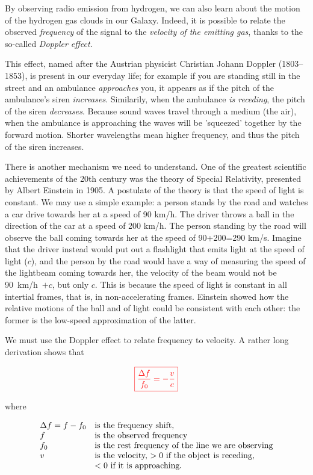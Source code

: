 By observing radio emission from hydrogen, we can also learn about the
motion of the hydrogen gas clouds in our Galaxy. 
Indeed, it is possible to relate the observed {\em frequency} of the
signal to the {\em velocity of the emitting gas}, thanks to the
so-called {\em Doppler effect}.

This effect, named after the Austrian physicist Christian Johann
Doppler (1803--1853), is present in our everyday life; for example if
you are standing still in the street and an ambulance {\em approaches} you,
it appears as if the pitch of the ambulance's siren
{\em increases}. Similarily, when the ambulance {\em is receding}, the pitch of
the siren {\em decreases}. Because sound waves travel through a medium (the
air), when the ambulance is approaching the waves will be 'squeezed'
together by the forward motion. Shorter wavelengths mean higher
frequency, and thus the pitch of the siren increases.

There is another mechanism we need to understand.  
One of the greatest scientific achievements of the 20th
century was the theory of Special Relativity, presented by Albert
Einstein in 1905. A postulate of the theory is
that the speed of light is constant. We may use a simple example: a
person stands by the road and watches a car drive towards her at
a speed of 90 km/h. The driver throws a ball in the direction of the
car at a speed of 200 km/h. The person standing by the road will
observe the ball coming towards her at the speed of 90+200=290
km/s. Imagine that the driver instead would put out a flashlight that
emits light at the speed of light ($c$), and the person by the road
would have a way of measuring the speed of the lightbeam coming
towards her, the velocity of the beam would not be 90~km/h~$+ c$, 
but only $c$. This is because the speed of light is constant in
all intertial frames, that is, in non-accelerating frames.
Einstein showed how the relative motions of the ball and of light could be
consistent with each other: the former is the low-speed approximation of the
latter. 

We must use the Doppler effect to relate frequency to velocity.
A rather long derivation shows that

\begin{equation}
\color{red}{\boxed{
\frac{\Delta f}{f_0}=-\frac{v}{c}
}}
\end{equation}

where 

\begin{displaymath}
\begin{array}{ll}
\Delta f=f-f_0	&\hbox{is the frequency shift}, 	\\
f		&\hbox{is the observed frequency} 	\\
f_0		&\hbox{is
the rest frequency of the line we are observing}	\\
v		&\hbox{is the velocity, $> 0$ if the object is
receding,}						\\
		&\hbox{$< 0$ if it is approaching.}
\end{array}
\end{displaymath}

